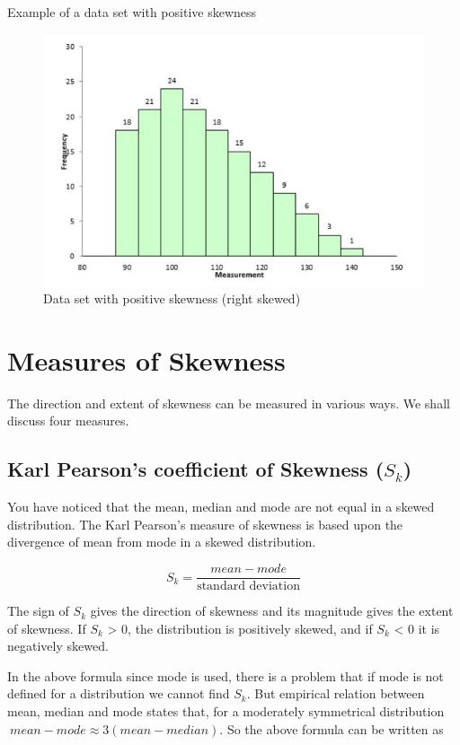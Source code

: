\documentclass[
]{book}
\begin{document}
Example of a data set with positive skewness

\begin{figure}

{\centering \includegraphics[width=0.7\linewidth]{images/image8_5} 

}

\caption{Data set with positive skewness (right skewed)}\label{fig:sk5}
\end{figure}

\section{Measures of Skewness}\label{measures-of-skewness}

The direction and extent of skewness can be measured in various ways. We shall discuss four measures.

\subsection{\texorpdfstring{Karl Pearson's coefficient of Skewness (\(S_{k}\))}{Karl Pearson's coefficient of Skewness (S\_\{k\})}}\label{karl-pearsons-coefficient-of-skewness-s_k}

You have noticed that the mean, median and mode are not equal in a skewed distribution. The Karl Pearson's measure of skewness is based upon the divergence of mean from mode in a skewed distribution.

\[S_{k} = \frac{mean - mode}{\text{standard deviation}}\]

The sign of \(S_{k}\) gives the direction of skewness and its magnitude gives the extent of skewness. If \(S_{k}\) \textgreater{} 0, the distribution is positively skewed, and if \(S_{k}\) \textless{} 0 it is negatively skewed.

In the above formula since mode is used, there is a problem that if mode is not defined for a distribution we cannot find \(S_{k}\). But empirical relation between mean, median and mode states that, for a moderately symmetrical distribution \(\ mean - mode \approx 3(mean - median)\). So the above formula can be written as
\end{document}
